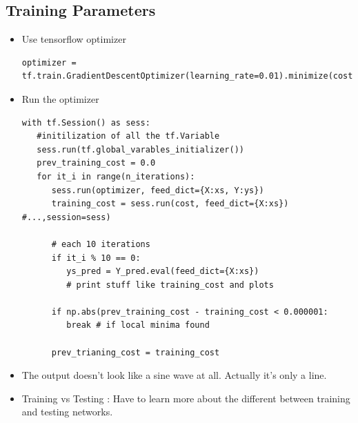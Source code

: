 \documentclass[12pt,a4paper]{article}
\begin{document}
\subsection{Training Parameters}
\begin{itemize}
\item Use tensorflow optimizer 
\begin{lstlisting}
optimizer = tf.train.GradientDescentOptimizer(learning_rate=0.01).minimize(cost)
\end{lstlisting}
\item Run the optimizer
\begin{lstlisting}
with tf.Session() as sess:
   #initilization of all the tf.Variable
   sess.run(tf.global_varables_initializer())
   prev_training_cost = 0.0
   for it_i in range(n_iterations):
      sess.run(optimizer, feed_dict={X:xs, Y:ys})
      training_cost = sess.run(cost, feed_dict={X:xs}) #...,session=sess)
      
      # each 10 iterations
      if it_i % 10 == 0:
         ys_pred = Y_pred.eval(feed_dict={X:xs})
         # print stuff like training_cost and plots
      
      if np.abs(prev_training_cost - training_cost < 0.000001:
         break # if local minima found
        
      prev_trianing_cost = training_cost
\end{lstlisting}
\item The output doesn't look like a sine wave at all. Actually it's only a line.
\item Training vs Testing : Have to learn more about the different between training and testing networks.
\end{itemize}
\end{document}
